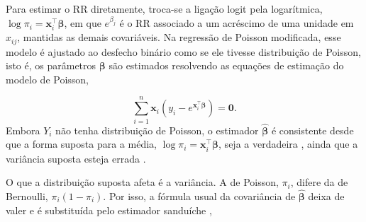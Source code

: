 \documentclass[12pt,a4paper]{article}
\begin{document}
Para estimar o RR diretamente, troca-se a ligação logit pela logarítmica, $\log \pi_i = \mathbf{x}_i^\top\boldsymbol{\beta}$, em que $e^{\beta_j}$ é o RR associado a um acréscimo de uma unidade em $x_{ij}$, mantidas as demais covariáveis. Na regressão de Poisson modificada, esse modelo é ajustado ao desfecho binário como se ele tivesse distribuição de Poisson, isto é, os parâmetros $\boldsymbol{\beta}$ são estimados resolvendo as equações de estimação do modelo de Poisson,

\begin{equation}
  \sum_{i=1}^{n} \mathbf{x}_i \left(y_i - e^{\mathbf{x}_i^\top\boldsymbol{\beta}}\right) = \mathbf{0}. \label{eq:score}
\end{equation}
Embora $Y_i$ não tenha distribuição de Poisson, o estimador $\hat{\boldsymbol{\beta}}$ é consistente desde que a forma suposta para a média, $\log \pi_i = \mathbf{x}_i^\top\boldsymbol{\beta}$, seja a verdadeira \citep{zou2004modified,spiegelman2005easy}, ainda que a variância suposta esteja errada \citep[pp.~128, 279]{agresti2015foundations}.

O que a distribuição suposta afeta é a variância. A de Poisson, $\pi_i$, difere da de Bernoulli, $\pi_i(1-\pi_i)$. Por isso, a fórmula usual da covariância de $\hat{\boldsymbol{\beta}}$ deixa de valer e é substituída pelo estimador sanduíche \citep[p.~280]{agresti2015foundations},
\end{document}
